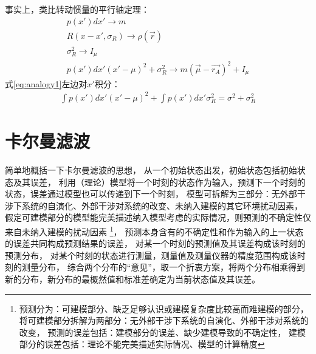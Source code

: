 事实上，类比转动惯量的平行轴定理：
\begin{gather}
    p(x')dx'\rightarrow m\\
    R(x-x',\sigma_{R})\rightarrow \rho(\overrightarrow{r})\\
    \sigma_{R}^{2}\rightarrow I_{\mu}\\
    p(x')dx'(x'-\mu)^{2}+\sigma_{R}^{2}\rightarrow m(\overrightarrow{\mu} -\overrightarrow{r_{A}})^{2}+I_{\mu}\label{eq:analogy1}
\end{gather}
式\ref{eq:analogy1}左边对$x'$积分：
\begin{gather}
    \int p(x')dx'(x'-\mu)^{2} + \int p(x')dx'\sigma_{R}^{2}=\sigma^{2}+\sigma_{R}^{2}
\end{gather}

\section{卡尔曼滤波}

简单地概括一下卡尔曼滤波的思想，
从一个初始状态出发，初始状态包括初始状态及其误差，
利用（理论）模型将一个时刻的状态作为输入，预测下一个时刻的状态，误差通过模型也可以传递到下一个时刻，
模型可拆解为三部分：无外部干涉下系统的自演化、外部干涉对系统的改变、未纳入建模的其它环境扰动因素，
假定可建模部分的模型能完美描述纳入模型考虑的实际情况，则预测的不确定性仅来自未纳入建模的扰动因素
\footnote{
    预测分为：可建模部分、缺乏足够认识或建模复杂度比较高而难建模的部分，
    将可建模部分拆解为两部分：无外部干涉下系统的自演化、外部干涉对系统的改变，
    预测的误差包括：建模部分的误差、缺少建模导致的不确定性，
    建模部分的误差包括：理论不能完美描述实际情况、模型的计算精度
}，
预测本身含有的不确定性和作为输入的上一状态的误差共同构成预测结果的误差，
对某一个时刻的预测值及其误差构成该时刻的预测分布，
对某个时刻的状态进行测量，测量值及测量仪器的精度范围构成该时刻的测量分布，
综合两个分布的“意见”，取一个折衷方案，将两个分布相乘得到新的分布，新分布的最概然值和标准差确定为当前状态值及其误差。
